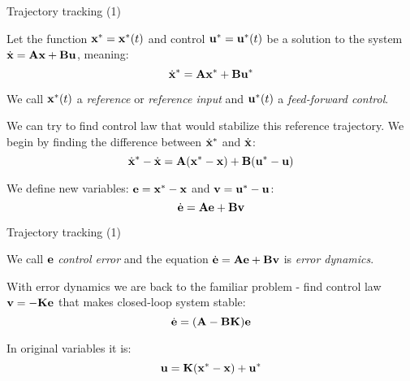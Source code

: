 \documentclass{beamer}
\begin{document}
\begin{frame}{Trajectory tracking (1)}
	\begin{flushleft}
		
		Let the function $\mathbf{x}^* = \mathbf{x}^*(t)$ and control $\mathbf{u}^* = \mathbf{u}^*(t)$ be a solution to the system $\dot{\mathbf{x}} = \mathbf{A}\mathbf{x} + \mathbf{B}\mathbf{u}$, meaning:
		\begin{equation}
			\dot{\mathbf{x}}^* = \mathbf{A}\mathbf{x}^* + \mathbf{B}\mathbf{u}^*
		\end{equation}
	
		We call $\mathbf{x}^*(t)$ a \emph{reference} or \emph{reference input} and $\mathbf{u}^*(t)$ a \emph{feed-forward control}.
		
		\bigskip
		
		We can try to find control law that would stabilize this reference trajectory. We begin by finding the difference between $\dot{\mathbf{x}}^*$ and $\dot{\mathbf{x}}$:
		\begin{equation}
			\dot{\mathbf{x}}^* - \dot{\mathbf{x}}= \mathbf{A}(\mathbf{x}^*-\mathbf{x}) + \mathbf{B}(\mathbf{u}^*-\mathbf{u})
		\end{equation}
		
		We define new variables: $\mathbf{e} = \mathbf{x}^* - \mathbf{x}$ and $\mathbf{v} = \mathbf{u}^* - \mathbf{u}$:
		\begin{equation}
			\dot{\mathbf{e}} = \mathbf{A}\mathbf{e} + \mathbf{B}\mathbf{v}
		\end{equation}
		
	\end{flushleft}
\end{frame}



\begin{frame}{Trajectory tracking (1)}
	\begin{flushleft}
		
		We call $\mathbf{e}$ \emph{control error} and the equation $\dot{\mathbf{e}} = \mathbf{A}\mathbf{e} + \mathbf{B}\mathbf{v}$ is \emph{error dynamics}.
		
		With error dynamics we are back to the familiar problem - find control law $\mathbf{v} = -\mathbf{K}\mathbf{e}$ that makes closed-loop system stable:
		\begin{equation}
			\dot{\mathbf{e}} = (\mathbf{A} - \mathbf{B}\mathbf{K}) \mathbf{e}
		\end{equation}
		
		In original variables it is:
		\begin{equation}
			\mathbf{u} = \mathbf{K}(\mathbf{x}^* - \mathbf{x}) + \mathbf{u}^*
		\end{equation}
		
	\end{flushleft}
\end{frame}
\end{document}
